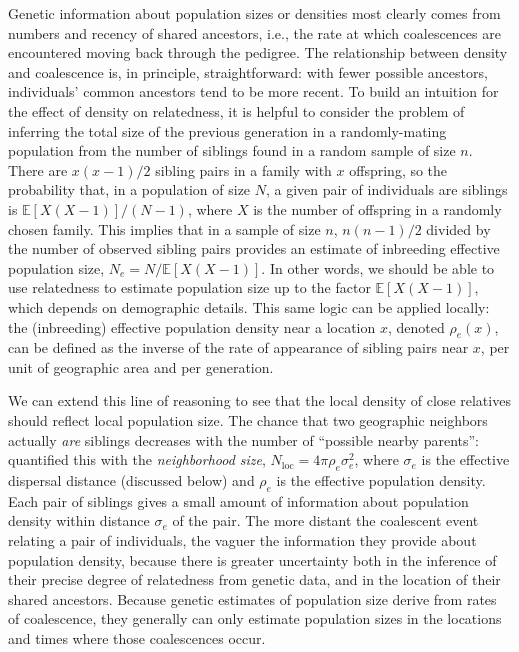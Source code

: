 \documentclass{ar-1col}
\renewcommand{\emph}[1]{{\textit{#1}}}
\newcommand{\E}{\mathbb{E}}
\begin{document}
Genetic information about population sizes or densities most clearly
comes from numbers and recency of shared ancestors, 
i.e., the rate at which coalescences are encountered moving back through the pedigree.
The relationship between density and coalescence is, in principle, straightforward:
with fewer possible ancestors,
individuals' common ancestors tend to be more recent.
To build an intuition for the effect of density on relatedness,
it is helpful to consider 
the problem of inferring the total size of the previous generation
in a randomly-mating population
from the number of siblings found in a random sample of size $n$.
There are $x (x-1) / 2$ sibling pairs in a family with $x$ offspring,
so the probability that, 
in a population of size $N$, 
a given pair of individuals are siblings
is $\E[X (X-1)] / (N-1)$, where $X$ is the number of offspring in a randomly chosen family.
This implies that in a sample of size $n$,
$n(n-1)/2$ divided by the number of observed sibling pairs 
provides an estimate of inbreeding effective population size, $N_e = N/\E[X(X-1)]$.
In other words, we should be able to use relatedness to estimate population size
up to the factor $\E[X(X-1)]$, which depends on demographic details. 
This same logic can be applied locally:
the (inbreeding) effective population density
near a location $x$, denoted $\rho_e(x)$,
can be defined as the inverse of the rate of appearance of sibling pairs
near $x$, per unit of geographic area and per generation.

We can extend this line of reasoning to see that 
the local density of close relatives
should reflect local population size.
The chance that two geographic neighbors actually \textit{are} siblings 
decreases with the number of ``possible nearby parents'':
\citet{wright1946isolation} quantified this with the
\emph{neighborhood size}, 
$N_\text{loc} = 4 \pi \rho_e \sigma_e^2$,
where $\sigma_e$ is the effective dispersal distance (discussed below)
and $\rho_e$ is the effective population density.
Each pair of siblings gives a small amount of information
about population density within distance $\sigma_e$ of the pair.
The more distant the coalescent event relating a pair of individuals, 
the vaguer the information they provide about population density,
because there is greater uncertainty 
both in the inference of their precise degree of relatedness from genetic data,
and in the location of their shared ancestors.
Because genetic estimates of population size 
derive from rates of coalescence,
they generally can only estimate population sizes 
in the locations and times where those coalescences occur.
\end{document}
